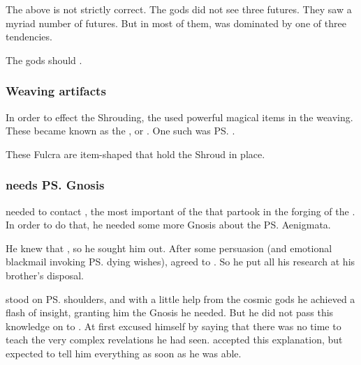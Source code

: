 The above is not strictly correct. 
The gods did not see three futures. 
They saw a myriad number of futures. 
But in most of them, \Miith{} was dominated by one of three tendencies. 

The gods should . 





\subsubsection{Weaving artifacts}
In order to effect the Shrouding, the \dragons{} used powerful magical items in the weaving. 
These became known as the , or . 
One such was \ps{\Ishnaruchaefir} . 

These Fulcra are item-shaped \vertices{} that hold the Shroud in place. 






\subsubsection{\Ishnaruchaefir{} needs \ps{\Secherdamon} Gnosis}
\Ishnaruchaefir{} needed to contact , the most important of the \xss{} that partook in the forging of the . 
In order to do that, he needed some more Gnosis about the \ps{\xss} Aenigmata. 

He knew that , so he sought him out. 
After some persuasion (and emotional blackmail invoking \ps{\Nexagglachel} dying wishes), \Secherdamon{} agreed to \cooperate. 
So he put all his research at his brother's disposal. 

\Ishnaruchaefir{} stood on \ps{\Secherdamon} shoulders, and with a little help from the cosmic gods he achieved a flash of insight, granting him the Gnosis he needed. 
But he did not pass this knowledge on to \Secherdamon. 
At first \Ishnaruchaefir{} excused himself by saying that there was no time to teach \Secherdamon{} the very complex revelations he had seen.
\Secherdamon{} accepted this explanation, but expected \Ishnaruchaefir{} to tell him everything as soon as he was able. 

